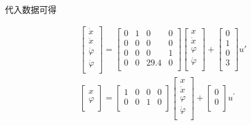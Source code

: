 \documentclass{MathorCupmodeling}
\begin{document}
代入数据可得

\begin{equation}
\begin{aligned}
&\begin{bmatrix}
\dot x\\
\ddot x\\
\dot{\varphi}\\
\ddot{\varphi}\\
\end{bmatrix}
=
\begin{bmatrix}
0 & 1 & 0 & 0\\
0 & 0 & 0 & 0\\
0 & 0 & 0 & 1\\
0 & 0 & 29.4 & 0\\
\end{bmatrix}
\begin{bmatrix}
x\\
\dot x\\
\varphi\\
\dot{\varphi}\\
\end{bmatrix}
+
\begin{bmatrix}
0\\
1\\
0\\
3\\
\end{bmatrix}
u'\\
&\begin{bmatrix}
x\\
\varphi\\
\end{bmatrix}
=
\begin{bmatrix}
1 &0 &0 &0\\
0 &0 &1 &0\\
\end{bmatrix}
\begin{bmatrix}
x\\
\dot x\\
\varphi\\
\dot{\varphi}\\
\end{bmatrix}
+
\begin{bmatrix}
0\\
0\\
\end{bmatrix}
u^{'}\\
\end{aligned}
\end{equation}
\end{document}
